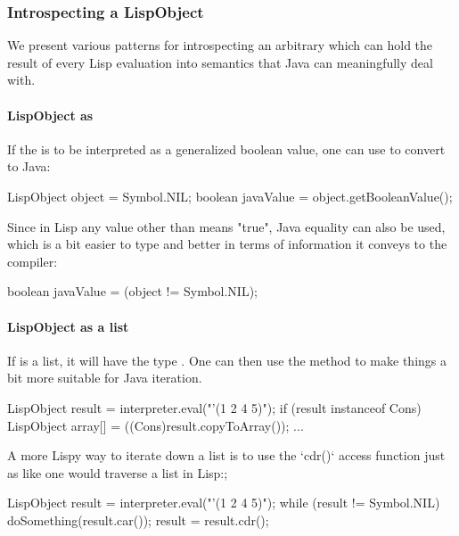 \documentclass[10pt]{book}
\begin{document}
\subsubsection{Introspecting a LispObject}
\label{topic:Introspecting a LispObject}

We present various patterns for introspecting an arbitrary
 which can hold the result of every Lisp evaluation
into semantics that Java can meaningfully deal with.

\paragraph{LispObject as }

If the  is to be interpreted as a generalized boolean
value, one can use  to convert to Java:

\begin{listing-java}
   LispObject object = Symbol.NIL;
   boolean javaValue = object.getBooleanValue();
\end{listing-java}

Since in Lisp any value other than  means "true", Java
equality can also be used, which is a bit easier to type and better in
terms of information it conveys to the compiler:

\begin{listing-java}
    boolean javaValue = (object != Symbol.NIL);
\end{listing-java}

\paragraph{LispObject as a list}

If  is a list, it will have the type .  One
can then use the  method to make things a bit more
suitable for Java iteration.

\begin{listing-java}
  LispObject result = interpreter.eval("'(1 2 4 5)");
  if (result instanceof Cons) {
    LispObject array[] = ((Cons)result.copyToArray());
    ...
  }
\end{listing-java}

A more Lispy way to iterate down a list is to use the `cdr()` access
function just as like one would traverse a list in Lisp:;

\begin{listing-java}
  LispObject result = interpreter.eval("'(1 2 4 5)");
  while (result != Symbol.NIL) {
    doSomething(result.car());
    result = result.cdr();
  }
\end{listing-java}
\end{document}
